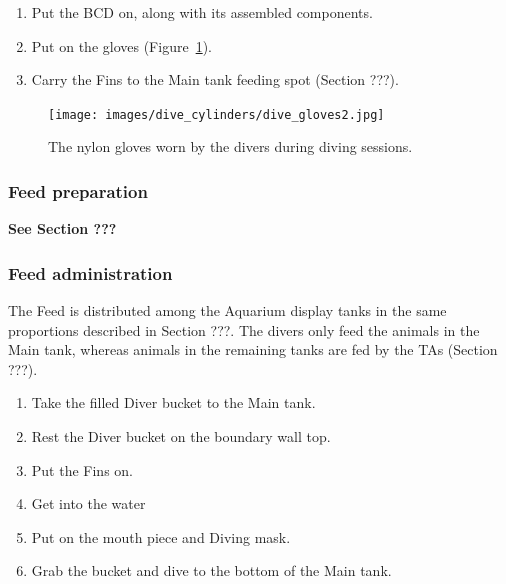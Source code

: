 \documentclass[
  12pt,
]{report}
\providecommand{\tightlist}{%
  \setlength{\itemsep}{0pt}\setlength{\parskip}{0pt}}\usepackage{longtable,booktabs,array}
\begin{document}
\begin{enumerate}
\def\labelenumi{\arabic{enumi}.}
\setcounter{enumi}{9}
\tightlist
\item
  Put the BCD on, along with its assembled components.
\item
  Put on the gloves (Figure~\ref{fig-dive-gloves}).
\item
  Carry the Fins to the Main tank feeding spot (Section ???).
\end{enumerate}

\begin{figure}[H]

{\centering \texttt{[image: images/dive\_cylinders/dive\_gloves2.jpg]}

}

\caption{\label{fig-dive-gloves}The nylon gloves worn by the divers
during diving sessions.}

\end{figure}

\hypertarget{feed-preparation-1}{%
\subsubsection{Feed preparation}\label{feed-preparation-1}}

\textbf{See Section ???}

\hypertarget{feed-administration-1}{%
\subsubsection{Feed administration}\label{feed-administration-1}}

The Feed is distributed among the Aquarium display tanks in the same
proportions described in Section ???. The divers only feed the animals
in the Main tank, whereas animals in the remaining tanks are fed by the
TAs (Section ???).

\begin{enumerate}
\def\labelenumi{\arabic{enumi}.}
\setcounter{enumi}{22}
\tightlist
\item
  Take the filled Diver bucket to the Main tank.
\item
  Rest the Diver bucket on the boundary wall top.
\item
  Put the Fins on.
\item
  Get into the water
\item
  Put on the mouth piece and Diving mask.
\item
  Grab the bucket and dive to the bottom of the Main tank.
\end{enumerate}
\end{document}
